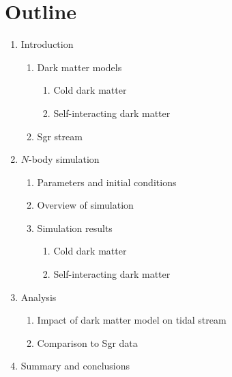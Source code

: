 \documentclass{article}
\begin{document}
\section*{Outline}
\begin{enumerate}

\item Introduction
\begin{enumerate}
    \item Dark matter models
    \begin{enumerate}
        \item Cold dark matter
        \item Self-interacting dark matter
    \end{enumerate}

    \item Sgr stream
\end{enumerate}

\item $N$-body simulation
\begin{enumerate}
    \item Parameters and initial conditions
    \item Overview of simulation
    \item Simulation results
    \begin{enumerate}
        \item Cold dark matter
        \item Self-interacting dark matter
    \end{enumerate}
\end{enumerate}

\item Analysis
\begin{enumerate}
    \item Impact of dark matter model on tidal stream
    \item Comparison to Sgr data
\end{enumerate}

\item Summary and conclusions

\end{enumerate}
\end{document}

